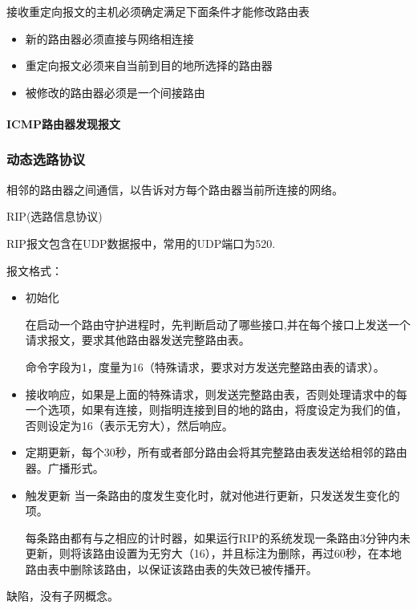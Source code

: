 接收重定向报文的主机必须确定满足下面条件才能修改路由表
\begin{itemize}
\item 新的路由器必须直接与网络相连接
\item 重定向报文必须来自当前到目的地所选择的路由器
\item 被修改的路由器必须是一个间接路由
\end{itemize}

\paragraph{ICMP路由器发现报文}

\subsubsection{动态选路协议}
相邻的路由器之间通信，以告诉对方每个路由器当前所连接的网络。

RIP(选路信息协议)

RIP报文包含在UDP数据报中，常用的UDP端口为520.

报文格式：

\begin{itemize}
\item 初始化

在启动一个路由守护进程时，先判断启动了哪些接口,并在每个接口上发送一个请求报文，要求其他路由器发送完整路由表。

命令字段为1，度量为16（特殊请求，要求对方发送完整路由表的请求）。

\item 接收响应，如果是上面的特殊请求，则发送完整路由表，否则处理请求中的每一个选项，如果有连接，则指明连接到目的地的路由，将度设定为我们的值，否则设定为16（表示无穷大），然后响应。

\item 定期更新，每个30秒，所有或者部分路由会将其完整路由表发送给相邻的路由器。广播形式。

\item 触发更新 当一条路由的度发生变化时，就对他进行更新，只发送发生变化的项。

每条路由都有与之相应的计时器，如果运行RIP的系统发现一条路由3分钟内未更新，则将该路由设置为无穷大（16），并且标注为删除，再过60秒，在本地路由表中删除该路由，以保证该路由表的失效已被传播开。

\end{itemize}

缺陷，没有子网概念。



